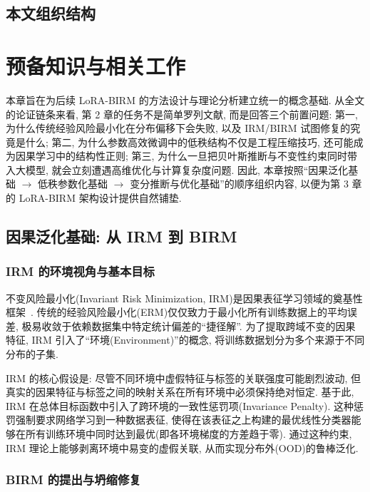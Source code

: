 \documentclass[a4paper,punct=banjiao,twoside]{ctexrep}
\theoremstyle{plain}
\theoremstyle{definition}
\theoremstyle{remark}
\begin{document}
\section{本文组织结构}

\chapter{预备知识与相关工作}

本章旨在为后续 LoRA-BIRM 的方法设计与理论分析建立统一的概念基础. 从全文的论证链条来看, 第 2 章的任务不是简单罗列文献, 而是回答三个前置问题: 第一, 为什么传统经验风险最小化在分布偏移下会失败, 以及 IRM/BIRM 试图修复的究竟是什么; 第二, 为什么参数高效微调中的低秩结构不仅是工程压缩技巧, 还可能成为因果学习中的结构性正则; 第三, 为什么一旦把贝叶斯推断与不变性约束同时带入大模型, 就会立刻遭遇高维优化与计算复杂度问题. 因此, 本章按照“因果泛化基础 $\rightarrow$ 低秩参数化基础 $\rightarrow$ 变分推断与优化基础”的顺序组织内容, 以便为第 3 章的 LoRA-BIRM 架构设计提供自然铺垫.

\section{因果泛化基础: 从 IRM 到 BIRM}

\subsection{IRM 的环境视角与基本目标}

不变风险最小化(Invariant Risk Minimization, IRM)是因果表征学习领域的奠基性框架~\cite{arjovsky2019invariant}. 传统的经验风险最小化(ERM)仅仅致力于最小化所有训练数据上的平均误差, 极易收敛于依赖数据集中特定统计偏差的“捷径解”. 为了提取跨域不变的因果特征, IRM 引入了“环境(Environment)”的概念, 将训练数据划分为多个来源于不同分布的子集. 

IRM 的核心假设是: 尽管不同环境中虚假特征与标签的关联强度可能剧烈波动, 但真实的因果特征与标签之间的映射关系在所有环境中必须保持绝对恒定. 基于此, IRM 在总体目标函数中引入了跨环境的一致性惩罚项(Invariance Penalty). 这种惩罚强制要求网络学习到一种数据表征, 使得在该表征之上构建的最优线性分类器能够在所有训练环境中同时达到最优(即各环境梯度的方差趋于零). 通过这种约束, IRM 理论上能够剥离环境中易变的虚假关联, 从而实现分布外(OOD)的鲁棒泛化.

\subsection{BIRM 的提出与坍缩修复}
\end{document}

